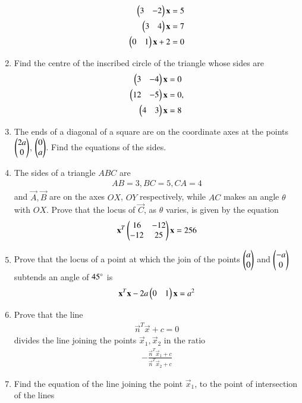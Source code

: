 \begin{enumerate}[label=\arabic*.,ref=\thesubsection.\theenumi]
\begin{align}
\begin{pmatrix}3&-2\end{pmatrix}\mathbf{x}=5
\\ 
\begin{pmatrix}3 &4\end{pmatrix}\mathbf{x}=7
\\
\begin{pmatrix}0 & 1\end{pmatrix}\mathbf{x}  +2 = 0
\end{align}
\item Find the centre of the inscribed circle of the triangle whose sides are
\begin{align}
\begin{pmatrix}3&-4\end{pmatrix}\mathbf{x}&=0
\\
\begin{pmatrix} 12&-5\end{pmatrix}\mathbf{x}&=0,
\\ 
\begin{pmatrix}4&3\end{pmatrix}\mathbf{x}&=8
\end{align}
\renewcommand{\theequation}{\theenumi}
\item The ends of a diagonal of a square are on the coordinate axes at the points $\begin{pmatrix}2a\\0\end{pmatrix}$, $\begin{pmatrix}0\\a\end{pmatrix}$.  Find the equations of the sides.
\item The sides of a triangle $ABC$ are
\begin{align}
AB=3, BC = 5, CA = 4
\end{align}
and $\vec{A}, \vec{B}$ are on the axes $OX$, $OY$ respectively, while $AC$ makes an angle $\theta$ with $OX$.  Prove that the locus of $\vec{C}$, as $\theta$ varies, is given by the equation
\begin{align}
\mathbf{x}^T\begin{pmatrix}16 & -12\\-12 & 25\end{pmatrix}\mathbf{x} = 256
\end{align}
\item Prove that the locus of a point at which the join of the points $\begin{pmatrix}a\\0\end{pmatrix}$ and $\begin{pmatrix}-a\\0\end{pmatrix}$ subtends an angle of $45\degree$ is
\begin{align}
\mathbf{x}^T\mathbf{x}-2a\begin{pmatrix}0 & 1\end{pmatrix}\mathbf{x} = a^2
\end{align}
\item Prove that the line
\begin{align}
\vec{n}^T\vec{x}+c=0
\end{align}
divides the line joining  the points $\vec{x}_1, \vec{x}_2$ in the ratio
\begin{align}
-\frac{\vec{n}^T\vec{x}_1+c}{\vec{n}^T\vec{x}_2+c}
\end{align}
\item Find the equation of the line joining the point $\vec{x}_1$, to the point of intersection of the lines

\end{enumerate}
